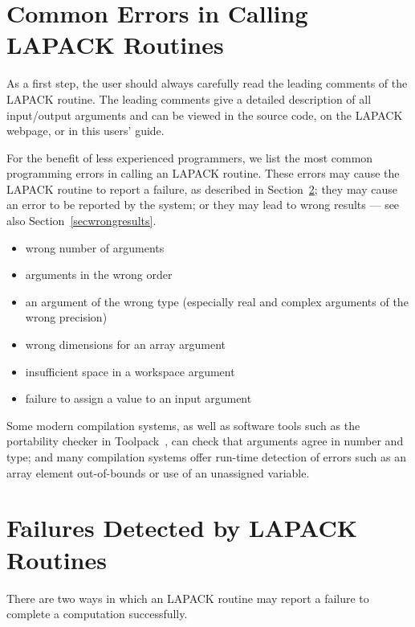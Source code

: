 \section{Common Errors in Calling LAPACK Routines}\label{seccommonerrors}

As a first step, the user should always carefully read the leading
comments of the LAPACK routine.  The leading comments give a detailed
description of all input/output arguments and can be viewed in the source
code, on the LAPACK webpage, or in this users' guide.

For the benefit of less experienced programmers, we list the most
common programming errors in calling an LAPACK routine.
These errors may cause the LAPACK routine to report a failure,
as described in Section~\ref{secfailures};
they may cause an error to be reported by the system;
or they may lead to wrong results --- see also
Section~\ref{secwrongresults}.

\begin{itemize}
\item wrong number of arguments
\item arguments in the wrong order
\item an argument of the wrong type (especially real and complex 
arguments of the wrong precision)
\item wrong dimensions for an array argument
\item insufficient space in a workspace argument
\item failure to assign a value to an input argument
\end{itemize}

Some modern compilation systems, as well as
software tools such as the portability checker in 
Toolpack~\cite{Toolpack}, can check that arguments agree in number and type;
and many compilation systems offer run-time detection
of errors such as an array element out-of-bounds or use of an
unassigned variable.

\section{Failures Detected by LAPACK Routines}\label{secfailures}

There are two ways in which an LAPACK routine may report a failure to
complete a computation successfully.

